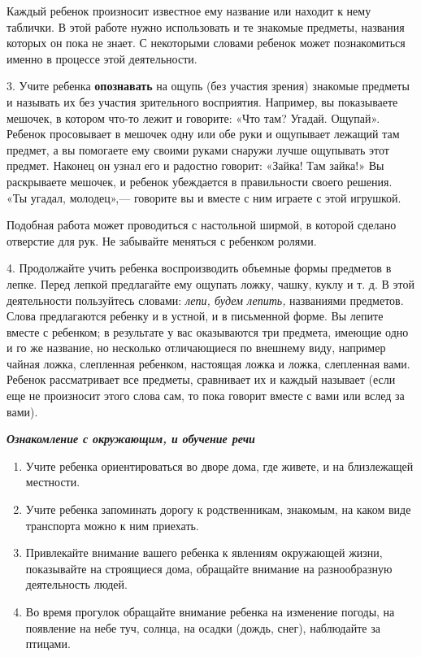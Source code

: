 \documentclass[a5paper]{book}
\renewcommand{\emph}[1]{\textit{#1}}
\begin{document}
Каждый ребенок произносит известное ему название или находит к нему
таблички. В этой работе нужно использовать и те знакомые предметы,
названия которых он пока не знает. С некоторыми словами ребенок может
познакомиться именно в процессе этой деятельности.

3. Учите ребенка \textbf{опознавать} на ощупь (без участия зрения)
знакомые предметы и называть их без участия зрительного восприятия.
Например, вы показываете мешочек, в котором что-то лежит и говорите:
«Что там? Угадай. Ощупай». Ребенок просовывает в мешочек одну или обе
руки и ощупывает лежащий там предмет, а вы помогаете ему своими руками
снаружи лучше ощупывать этот предмет. Наконец он узнал его и радостно
говорит: «Зайка! Там зайка!» Вы раскрываете мешочек, и ребенок
убеждается в правильности своего решения. «Ты угадал, молодец»,---
говорите вы и вместе с ним играете с этой игрушкой.

Подобная работа может проводиться с настольной ширмой, в которой сделано
отверстие для рук. Не забывайте меняться с ребенком ролями.

4. Продолжайте учить ребенка воспроизводить объемные формы предметов в
лепке. Перед лепкой предлагайте ему ощупать ложку, чашку, куклу и т. д.
В этой деятельности пользуйтесь словами: \emph{лепи, будем лепить,}
названиями предметов. Слова предлагаются ребенку и в устной, и в
письменной форме. Вы лепите вместе с ребенком; в результате у вас
оказываются три предмета, имеющие одно и го же название, но несколько
отличающиеся по внешнему виду, например чайная ложка, слепленная
ребенком, настоящая ложка и ложка, слепленная вами. Ребенок
рассматривает все предметы, сравнивает их и каждый называет (если еще не
произносит этого слова сам, то пока говорит вместе с вами или вслед за
вами).

\emph{\textbf{Ознакомление с окружающим, и обучение речи}}


\begin{enumerate}
\def\labelenumi{\arabic{enumi}.}
\item
  
  Учите ребенка ориентироваться во дворе дома, где живете, и на
  близлежащей местности.
  
\item
  
  Учите ребенка запоминать дорогу к родственникам, знакомым, на каком
  виде транспорта можно к ним приехать.
  
\item
  
  Привлекайте внимание вашего ребенка к явлениям окружающей жизни,
  показывайте на строящиеся дома, обращайте внимание на разнообразную
  деятельность людей.
  
\item
  
  Во время прогулок обращайте внимание ребенка на изменение погоды, на
  появление на небе туч, солнца, на осадки (дождь, снег), наблюдайте за
  птицами.
  
\end{enumerate}
\end{document}
